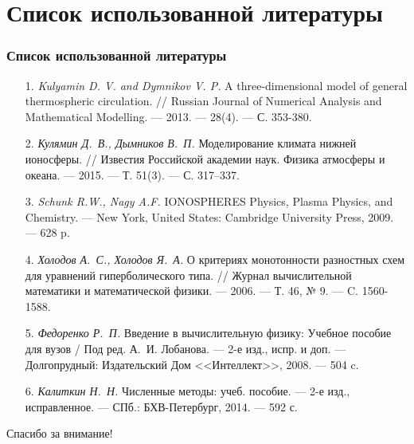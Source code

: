 \documentclass[9pt, apectratio=43,unicode]{beamer}
\begin{document}
\section{Список использованной литературы}
\begin{frame}\frametitle{Список использованной литературы}

\begin{itemize}
\item[1.] \textit{Kulyamin D. V. and Dymnikov V. P.} A three-dimensional model of general thermospheric circulation. // Russian Journal of Numerical Analysis and Mathematical Modelling. --- 2013. --- 28(4). --- С. 353-380.
\item[2.] \textit{Кулямин Д.~В., Дымников В.~П.} Моделирование климата нижней ионосферы. // Известия Российской академии наук. Физика атмосферы и океана. --- 2015. --- Т. 51(3). --- С. 317–337.
\item[3.] \textit{Schunk R.W., Nagy A.F.} IONOSPHERES Physics, Plasma Physics, and Chemistry. --- New York, United States: Cambridge University Press, 2009. --- 628 p.
\item[4.] \textit{Холодов А.~С., Холодов Я.~А.} О критериях монотонности разностных схем для уравнений гиперболического типа. // Журнал вычислительной математики и математической физики. --- 2006. --- Т. 46, № 9. --- C. 1560-1588.
\item[5.] \textit{Федоренко Р.~П.} Введение в вычислительную физику: Учебное пособие для вузов / Под ред. А.~И. Лобанова. --- 2-е изд., испр. и доп. --- Долгопрудный: Издательский Дом <<Интеллект>>, 2008. --- 504 c.
\item[6.] \textit{Калиткин Н.~Н.} Численные методы: учеб. пособие. --- 2-е изд., исправленное. --- СПб.: БХВ-Петербург, 2014. --- 592 с.
\end{itemize}

\end{frame}

\begin{frame}[plain]
  \begin{center}
  {\Huge Спасибо за внимание!}
  \end{center}
\end{frame}
\end{document}
